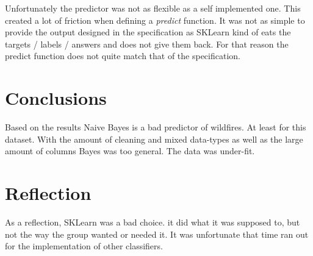 \documentclass[12pt letter]{article}
\begin{document}
Unfortunately the predictor was not as flexible as a self implemented one. This created a lot of friction when defining a \textit{predict} function. It was not as simple to provide the output designed in the specification as SKLearn kind of eats the targets / labels / answers and does not give them back. For that reason the predict function does not quite match that of the specification.\\

\section{Conclusions}
Based on the results Naive Bayes is a bad predictor of wildfires. At least for this dataset. With the amount of cleaning and mixed data-types as well as the large amount of columns Bayes was too general. The data was under-fit.

\section{Reflection}
As a reflection, SKLearn was a bad choice. it did what it was supposed to, but not the way the group wanted or needed it. It was unfortunate that time ran out for the implementation of other classifiers.\\
\end{document}
